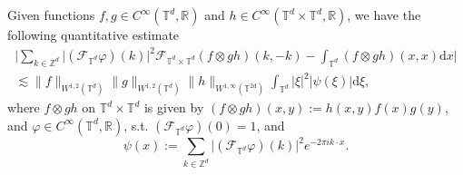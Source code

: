 \begin{lem}\label{lem:approx_delta_x(y)} Given functions $f, g \in C^{\infty}(\mathbb{T}^d,\mathbb{R})$ and $h \in C^{\infty}(\mathbb{T}^d \times \mathbb{T}^d,\mathbb{R})$, we have the following quantitative estimate 
\begin{equation}\label{approx_delta_x(y)}
\begin{split}
\Big|\sum_{k \in \mathbb{Z}^d}  \big|(\mathscr{F}_{\mathbb{T}^d}\varphi) (k)\big|^2 \mathscr{F}_{\mathbb{T}^d \times \mathbb{T}^d}(f \otimes g h)(k,-k) - \int_{\mathbb{T}^d} (f\otimes gh)(x,x)\mathrm{d}x \Big|\\ \lesssim \|f\|_{W^{1,2}(\mathbb{T}^d)}\|g\|_{W^{1,2}(\mathbb{T}^d)}\|h\|_{W^{1,\infty}(\mathbb{T}^{2d})} \int_{\mathbb{T}^d} |\xi|^2|\psi(\xi)|\mathrm{d}\xi, 
\end{split}
\end{equation}
where  $f \otimes g h$ on $\mathbb{T}^d \times \mathbb{T}^d$ is given by $(f\otimes gh)(x,y) := h(x,y)f(x)g(y)$, and $\varphi \in C^{\infty}(\mathbb{T}^d,\mathbb{R})$, s.t. $(\mathscr{F}_{\mathbb{T}^d}\varphi) (0) = 1$, and 
\begin{equation}\label{eq:def-psi}
\psi(x) :=  \sum_{k \in \mathbb{Z}^d}\big| (\mathscr{F}_{\mathbb{T}^d}\varphi) (k)\big|^2 e^{-2\pi i k\cdot x}.
\end{equation}
\end{lem}
